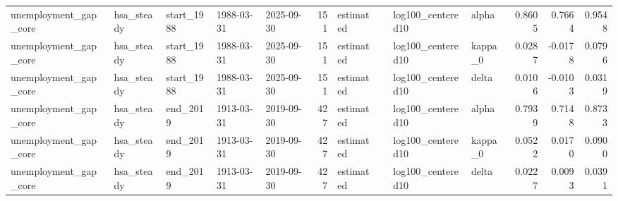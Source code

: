\begin{tabular}{lllllrllllrrr}
unemployment\_gap\_core & hsa\_steady & start\_1988 & 1988-03-31 & 2025-09-30 & 151 & estimated &  & log100\_centered10 & alpha & 0.8605 & 0.7664 & 0.9548 \\
unemployment\_gap\_core & hsa\_steady & start\_1988 & 1988-03-31 & 2025-09-30 & 151 & estimated &  & log100\_centered10 & kappa\_0 & 0.0287 & -0.0178 & 0.0796 \\
unemployment\_gap\_core & hsa\_steady & start\_1988 & 1988-03-31 & 2025-09-30 & 151 & estimated &  & log100\_centered10 & delta & 0.0106 & -0.0103 & 0.0319 \\
unemployment\_gap\_core & hsa\_steady & end\_2019 & 1913-03-31 & 2019-09-30 & 427 & estimated &  & log100\_centered10 & alpha & 0.7939 & 0.7148 & 0.8733 \\
unemployment\_gap\_core & hsa\_steady & end\_2019 & 1913-03-31 & 2019-09-30 & 427 & estimated &  & log100\_centered10 & kappa\_0 & 0.0522 & 0.0170 & 0.0900 \\
unemployment\_gap\_core & hsa\_steady & end\_2019 & 1913-03-31 & 2019-09-30 & 427 & estimated &  & log100\_centered10 & delta & 0.0227 & 0.0093 & 0.0391 \\
\bottomrule
\end{tabular}
